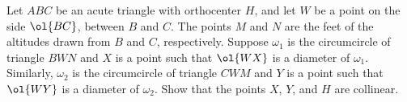Let $ABC$ be an acute triangle with orthocenter $H$,
and let $W$ be a point on the side $\ol{BC}$, between $B$ and $C$.
The points $M$ and $N$ are the feet of the altitudes
drawn from $B$ and $C$, respectively.
Suppose $\omega_1$ is the circumcircle of triangle $BWN$
and $X$ is a point such that $\ol{WX}$ is a diameter of $\omega_1$.
Similarly, $\omega_2$ is the circumcircle of triangle $CWM$
and $Y$ is a point such that $\ol{WY}$ is a diameter of $\omega_2$.
Show that the points $X$, $Y$, and $H$ are collinear.